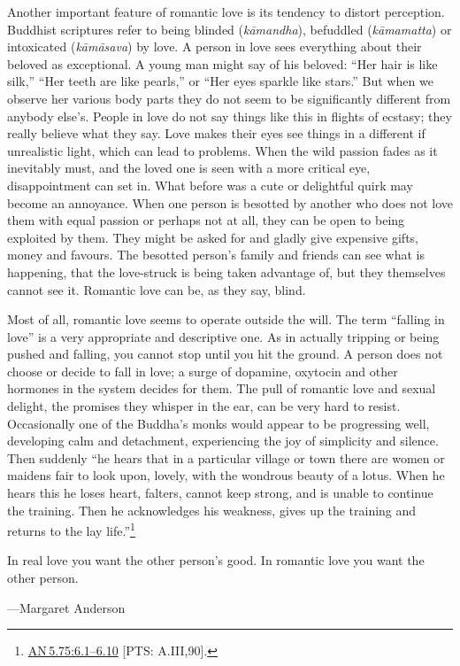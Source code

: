 \documentclass[10pt, openright]{book}
\newenvironment{epigram-2}%
{%
\setstretch{1.4}
\vspace{1em}
\noindent
\quoting[leftmargin=2cm,rightmargin=2cm]%
\begin{itshape}
\large
}%
{\end{itshape}\endquoting
}%
\newenvironment{epigram-2-cite}%
{%
\quoting[leftmargin=2cm,rightmargin=2cm]%
\noindent\normal\hspace*{\fill} 
}%
{\endquoting
}%
\begin{document}
Another important feature of romantic love is its tendency to distort perception. Buddhist scriptures refer to being blinded (\textit{kāmandha}), befuddled (\textit{kāmamatta}) or intoxicated (\textit{kāmāsava}) by love. A person in love sees everything about their beloved as exceptional. A young man might say of his beloved: “Her hair is like silk,” “Her teeth are like pearls,” or “Her eyes sparkle like stars.” But when we observe her various body parts they do not seem to be significantly different from anybody else’s. People in love do not say things like this in flights of ecstasy; they really believe what they say. Love makes their eyes see things in a different if unrealistic light, which can lead to problems. When the wild passion fades as it inevitably must, and the loved one is seen with a more critical eye, disappointment can set in. What before was a cute or delightful quirk may become an annoyance. When one person is besotted by another who does not love them with equal passion or perhaps not at all, they can be open to being exploited by them. They might be asked for and gladly give expensive gifts, money and favours. The besotted person’s family and friends can see what is happening, that the love-struck is being taken advantage of, but they themselves cannot see it. Romantic love can be, as they say, blind.


Most of all, romantic love seems to operate outside the will. The term “falling in love” is a very appropriate and descriptive one. As in actually tripping or being pushed and falling, you cannot stop until you hit the ground. A person does not choose or decide to fall in love; a surge of dopamine, oxytocin and other hormones in the system decides for them. The pull of romantic love and sexual delight, the promises they whisper in the ear, can be very hard to resist. Occasionally one of the Buddha’s monks would appear to be progressing well, developing calm and detachment, experiencing the joy of simplicity and silence. Then suddenly “he hears that in a particular village or town there are women or maidens fair to look upon, lovely, with the wondrous beauty of a lotus. When he hears this he loses heart, falters, cannot keep strong, and is unable to continue the training. Then he acknowledges his weakness, gives up the training and returns to the lay life.”\footnote {\href{https://suttacentral.net/an5.75/en/sujato\#6.1}{AN 5.75:6.1–6.10} [PTS: A.III,90].}


\begin{epigram-2}
In real love you want the other person’s good. In romantic love you want the other person.
\end{epigram-2}
\begin{epigram-2-cite}
—Margaret Anderson
\end{epigram-2-cite}
\end{document}
